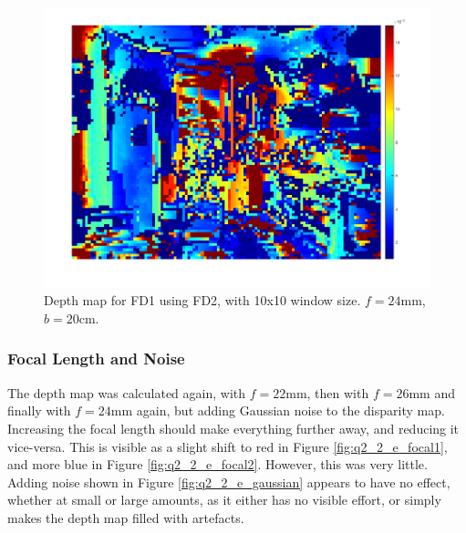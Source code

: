 \documentclass[a4paper, 10pt, conference]{ieeeconf}
\begin{document}
\begin{figure}[!ht]
  \centering
  \includegraphics[width=0.75\linewidth]{pic/q2_2_cd4_depth}
	\caption{Depth map for FD1 using FD2, with 10x10 window size. $f = 24\text{mm}$, $b = 20\text{cm}$.}
    \vspace{-0.5cm}
  \label{fig:depth}
\end{figure}

\subsubsection{Focal Length and Noise}

The depth map was calculated again, with $f = 22\text{mm}$, then with $f = 26\text{mm}$ and finally with $f = 24\text{mm}$ again, but adding Gaussian noise to the disparity map. Increasing the focal length should make everything further away, and reducing it vice-versa. This is visible as a slight shift to red in Figure \ref{fig:q2_2_e_focal1}, and more blue in Figure \ref{fig:q2_2_e_focal2}. However, this was very little. Adding noise shown in Figure \ref{fig:q2_2_e_gaussian} appears to have no effect, whether at small or large amounts, as it either has no visible effort, or simply makes the depth map filled with artefacts.
\end{document}
